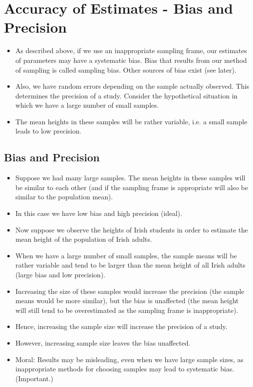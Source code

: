\documentclass[a4paper,12pt]{article}
\begin{document}
\section{Accuracy of Estimates - Bias and Precision}
\begin{itemize}
\item As described above, if we use an inappropriate sampling frame, our
estimates of parameters may have a systematic bias.
Bias that results from our method of sampling is called sampling
bias. Other sources of bias exist (see later).
\item Also, we have random errors depending on the sample actually
observed. This determines the precision of a study.
Consider the hypothetical situation in which we have a large
number of small samples.
\item The mean heights in these samples will
be rather variable, i.e. a small sample leads to low precision.
\end{itemize}
\subsection{Bias and Precision}
\begin{itemize}
\item Suppose we had many large samples. The mean heights in these
samples will be similar to each other (and if the sampling frame is
appropriate will also be similar to the population mean).
\item In this case we have low bias and high precision (ideal).
\item Now suppose we observe the heights of Irish students in order to estimate the mean height of the population of Irish adults.
\item When
we have a large number of small samples, the sample means will be rather variable and tend to be larger than the mean height of all
Irish adults (large bias and low precision).
\item Increasing the size of these samples would increase the precision
(the sample means would be more similar), but the bias is
unaffected (the mean height will still tend to be overestimated as
the sampling frame is inappropriate).
\item Hence, increasing the sample size will increase the precision of a
study.
\item However, increasing sample size leaves the bias unaffected.

\item Moral: Results may be misleading, even when we have large
sample sizes, as inappropriate methods for choosing samples may
lead to systematic bias. (Important.)
\end{itemize}
\end{document}
